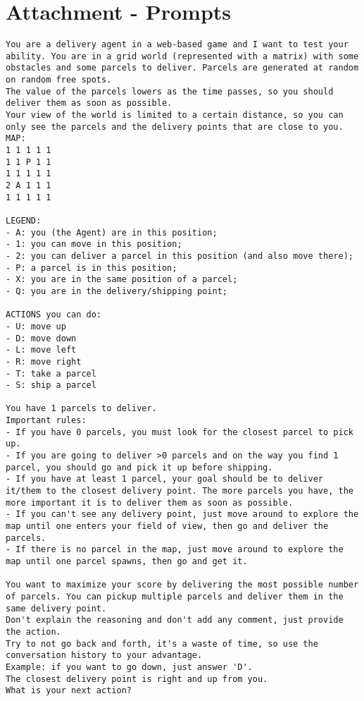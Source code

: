\chapter{Attachment - Prompts}
\label{cha:attachment}

\begin{codewindow}
  [Prompt]  \begin{lstlisting}
You are a delivery agent in a web-based game and I want to test your ability. You are in a grid world (represented with a matrix) with some obstacles and some parcels to deliver. Parcels are generated at random on random free spots.
The value of the parcels lowers as the time passes, so you should deliver them as soon as possible.
Your view of the world is limited to a certain distance, so you can only see the parcels and the delivery points that are close to you.
MAP:
1 1 1 1 1
1 1 P 1 1
1 1 1 1 1
2 A 1 1 1
1 1 1 1 1

LEGEND:
- A: you (the Agent) are in this position;
- 1: you can move in this position;
- 2: you can deliver a parcel in this position (and also move there);
- P: a parcel is in this position;
- X: you are in the same position of a parcel;
- Q: you are in the delivery/shipping point;

ACTIONS you can do:
- U: move up
- D: move down
- L: move left
- R: move right
- T: take a parcel
- S: ship a parcel

You have 1 parcels to deliver.
Important rules:
- If you have 0 parcels, you must look for the closest parcel to pick up.
- If you are going to deliver >0 parcels and on the way you find 1 parcel, you should go and pick it up before shipping.
- If you have at least 1 parcel, your goal should be to deliver it/them to the closest delivery point. The more parcels you have, the more important it is to deliver them as soon as possible.
- If you can't see any delivery point, just move around to explore the map until one enters your field of view, then go and deliver the parcels.
- If there is no parcel in the map, just move around to explore the map until one parcel spawns, then go and get it.

You want to maximize your score by delivering the most possible number of parcels. You can pickup multiple parcels and deliver them in the same delivery point.
Don't explain the reasoning and don't add any comment, just provide the action.
Try to not go back and forth, it's a waste of time, so use the conversation history to your advantage.
Example: if you want to go down, just answer 'D'.
The closest delivery point is right and up from you.
What is your next action?
\end{lstlisting}
\end{codewindow}